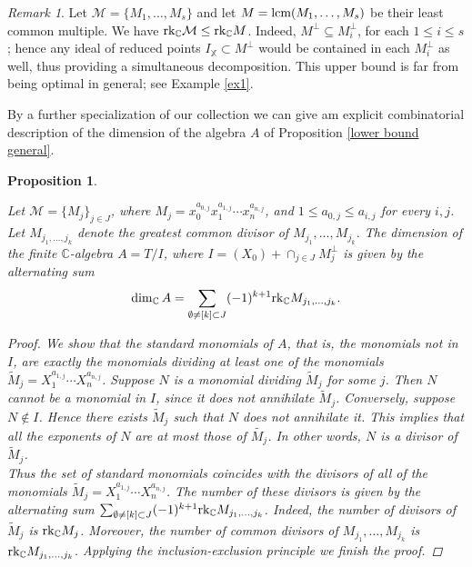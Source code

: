 \documentclass{amsart}
\theoremstyle{plain}
\newtheorem{proposition}[theorem]{Proposition}
\theoremstyle{definition}
\theoremstyle{remark}
\newtheorem{remark}{Remark}[section]
\begin{document}
\begin{remark}
Let $\mathcal M = \lbrace M_1,\ldots, M_s\rbrace$ and let $M = \textnormal{lcm}(M_1,\ldots,M_s)$ be their least common multiple. We have $\textnormal{rk}_{\mathbb C} \mathcal M \leq  \textnormal{rk}_{\mathbb C} M$. Indeed, $M^{\perp}\subseteq M_i^{\perp}$, for each $1\leq i\leq s$; hence any ideal of reduced points  $I_{\mathbb X}\subset M^{\perp}$ would be contained in each $M_i^{\perp}$ as well, thus providing a simultaneous decomposition. This upper bound is far from being optimal in general; see Example \ref{ex1}.
\end{remark}


By a further specialization of our collection we can give am explicit combinatorial description of the dimension of the algebra $A$ of Proposition \ref{lower bound general}.

\begin{proposition}\label{inclusion-exclusion}

Let $\mathcal M= \lbrace M_j\rbrace_{j\in J}$, where $M_j=x_0^{a_{0,j}}x_1^{a_{1,j}}\cdots x_n^{a_{n,j}}$, and $1\leq a_{0,j}\leq a_{i,j}$ for every $i,j$. Let $M_{j_1,\ldots, j_k}$ denote the greatest common divisor of $M_{j_1}, \ldots, M_{j_k}$. The dimension of the finite $\mathbb C$-algebra $A=T/I$, where $I=(X_0)+\cap_{j\in J} M_j^{\perp}$ is given by the alternating sum
$$
\dim_{\mathbb C} A = \sum_{\emptyset \neq [k] \subset J} (-1)^{k+1} \textnormal{rk}_{\mathbb C} M_{j_1,\ldots, j_k}.
$$

\begin{proof}

We show that the {\it standard monomials} of $A$, that is, the monomials {\it not} in $I$, are exactly the monomials dividing at least one of the monomials $\tilde{M}_j=X_1^{a_{1,j}}\cdots X_n^{a_{n,j}}$. Suppose $N$ is a monomial dividing $\tilde{M}_j$ for some $j$. Then $N$ cannot be a monomial in $I$, since it does not annihilate $\tilde{M}_j$. Conversely, suppose $N\notin I$. Hence there exists $\tilde{M}_j$ such that $N$ does not annihilate it. This implies that all the exponents of $N$ are at most those of $\tilde{M_j}$. In other words, $N$ is a divisor of $\tilde{M}_j$. \\
\indent Thus the set of standard monomials coincides with the divisors of all of the monomials $\tilde{M}_j=X_1^{a_{1,j}}\cdots X_n^{a_{n,j}}$. The number of these divisors is given by the alternating sum $\sum_{\emptyset \neq [k] \subset J} (-1)^{k+1} \textnormal{rk}_{\mathbb C} M_{j_1,\ldots, j_k}$. Indeed, the number of divisors of $\tilde{M}_j$ is $\textnormal{rk}_{\mathbb C} M_j$. Moreover, the number of common divisors of $M_{j_1}, \ldots, M_{j_k}$ is $\textnormal{rk}_{\mathbb C} M_{j_1,\ldots, j_k}$. Applying the inclusion-exclusion principle \cite[Chapter 2.1]{St} we finish the proof.
\end{proof}

\end{proposition}
\end{document}
